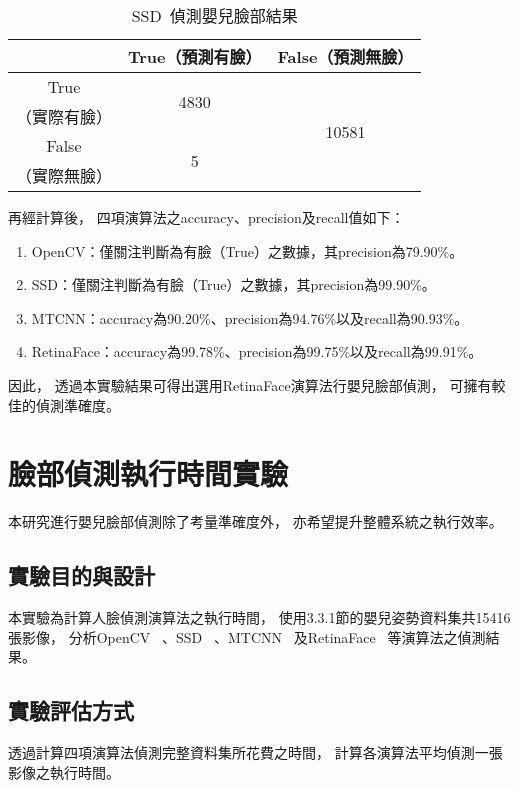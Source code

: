 \documentclass[class=NCU_thesis, crop=false]{standalone}
\begin{document}
\begin{table}[h]
    \centering
    \caption{SSD~\cite{ye_face_2021}偵測嬰兒臉部結果}
    \label{table:table-ssd}
    \begin{tabular}{ccc}
    \hline
     & True（預測有臉）& False（預測無臉）\\
    \hline
    True & \multirow{2}{*}{4830} & \multirow{4}{*}{10581} \\
    （實際有臉）& & \\
    False & \multirow{2}{*}{5} & \\
    （實際無臉）&  & \\
    \hline
    \end{tabular}
\end{table}

再經計算後，
四項演算法之accuracy、precision及recall值如下：
\begin{enumerate}
    \item OpenCV：僅關注判斷為有臉（True）之數據，其precision為79.90\%。
    \item SSD：僅關注判斷為有臉（True）之數據，其precision為99.90\%。
    \item MTCNN：accuracy為90.20\%、precision為94.76\%以及recall為90.93\%。
    \item RetinaFace：accuracy為99.78\%、precision為99.75\%以及recall為99.91\%。
\end{enumerate}

因此，
透過本實驗結果可得出選用RetinaFace演算法行嬰兒臉部偵測，
可擁有較佳的偵測準確度。

\section{臉部偵測執行時間實驗}
本研究進行嬰兒臉部偵測除了考量準確度外，
亦希望提升整體系統之執行效率。

\subsection{實驗目的與設計}
本實驗為計算人臉偵測演算法之執行時間，
使用3.3.1節的嬰兒姿勢資料集共15416張影像，
分析OpenCV~\cite{goyal_face_2017}
、SSD~\cite{ye_face_2021}
、MTCNN~\cite{zhang_joint_2016}
及RetinaFace~\cite{deng_retinaface_2020}
等演算法之偵測結果。

\subsection{實驗評估方式}
透過計算四項演算法偵測完整資料集所花費之時間，
計算各演算法平均偵測一張影像之執行時間。
\end{document}
